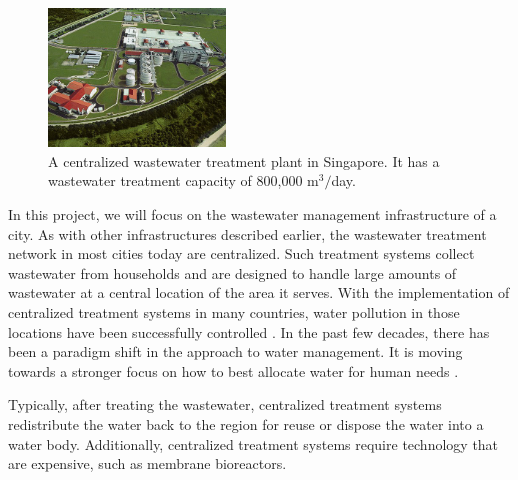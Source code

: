 \documentclass[preprint,12pt,authoryear]{elsarticle}
\begin{document}
\begin{figure}
	\begin{center}
		\includegraphics[width=0.42\textwidth]{changiwrp.jpg}
	\end{center}
	\caption[A centralized wastewater treatment plant in Singapore.]{A centralized wastewater treatment plant in Singapore. It has a wastewater treatment capacity of 800,000 m$^3/$day. \citep{changiwrp}} 
	\label{fig:changi}
\end{figure}%
In this project, we will focus on the wastewater management infrastructure of a city. As with other infrastructures described earlier, the wastewater treatment network in most cities today are centralized. Such treatment systems collect wastewater from households and are designed to handle large amounts of wastewater at a central location of the area it serves. With the implementation of centralized treatment systems in many countries, water pollution in those locations have been successfully controlled \citep{li2014}. In the past few decades, there has been a paradigm shift in the approach to water management. It is moving towards a stronger focus on how to best allocate water for human needs \citep{gleick2000}.

Typically, after treating the wastewater, centralized treatment systems redistribute the water back to the region for reuse or dispose the water into a water body. Additionally, centralized treatment systems require technology that are expensive, such as membrane bioreactors. 
\end{document}
